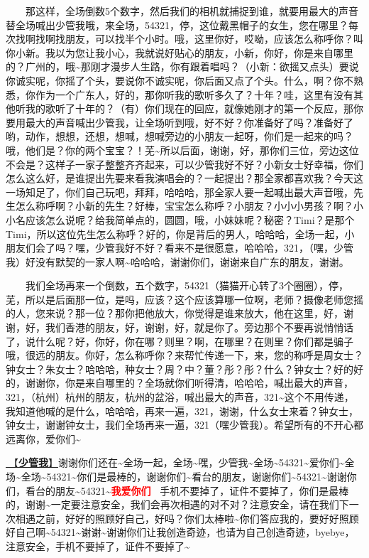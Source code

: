 \documentclass[]{ctexbook}
\begin{document}
  那这样，全场倒数5个数字，然后我们的相机就捕捉到谁，就要用最大的声音替全场喊出少管我哦，来全场，54321，停，这位戴黑帽子的女生，您在哪里？每次找啊找啊找朋友，可以找半个小时。哦，这里你好，哎呦，应该怎么称呼你？叫你小新。我以为您让我小心，我就说好贴心的朋友，小新，你好，你是来自哪里的？广州的，哦\textasciitilde 那刚才漫步人生路，你有跟着唱吗？（小新：欲摇又点头）要说你诚实呢，你摇了个头，要说你不诚实呢，你后面又点了个头。什么，啊？你不熟悉，你作为一个广东人，好的，那你听我的歌听多久了？十年？哇，这里有没有其他听我的歌听了十年的？（有）你们现在的回应，就像她刚才的第一个反应，那你要用最大的声音喊出少管我，让全场听到哦，好不好？你准备好了吗？准备好了哟，动作，想想，还想，想喊，想喊旁边的小朋友一起呀，你们是一起来的吗？哦，他们是？你的两个宝宝？！芜\textasciitilde 所以后面，谢谢，好，那你们三位，旁边这位不会是？这样子一家子整整齐齐起来，可以少管我好不好？小新女士好幸福，你们怎么这么好，是谁提出先要来看我演唱会的？一起提出？那全家都喜欢我？今天这一场知足了，你们自己玩吧，拜拜，哈哈哈，那全家人要一起喊出最大声音哦，先生怎么称呼啊？小新的先生？好棒，宝宝怎么称呼？小朋友？小小小男孩？啊？小小名应该怎么说呢？给我简单点的，圆圆，哦，小妹妹呢？秘密？Timi？是那个Timi，所以这位先生怎么称呼？好的，你是背后的男人，哈哈哈，全场一起，小朋友们会了吗？嘿，少管我好不好？看来不是很愿意，哈哈哈，321，（嘿，少管我）好没有默契的一家人啊\textasciitilde 哈哈哈，谢谢你们，谢谢来自广东的朋友，谢谢。

  我们全场再来一个倒数，五个数字，54321（猫猫开心转了3个圈圈），停，芜，所以是后面那一位，是吗，应该？这个应该算哪一位啊，老师？摄像老师您摇的人，您来说？那一位？那你把他放大，你觉得是谁来放大，他在这里，好，谢谢，好，我们香港的朋友，好，谢谢，好，就是你了。旁边那个不要再说悄悄话了，说什么呢？好，你好，你在哪？则里？啊，在哪里？在则里？你们都是骗子哦，很远的朋友。你好，怎么称呼你？来帮忙传递一下，来，您的称呼是周女士？钟女士？朱女士？哈哈哈，种女士？周？中？董？彤？彤？什么？钟女士？好的好的，谢谢你，你是来自哪里的？全场就你们听得清，哈哈哈，喊出最大的声音，321，（杭州）杭州的朋友，杭州的盆浴，喊出最大的声音，321\textasciitilde 这个不用传递，我知道他喊的是什么，哈哈哈，再来一遍，321，谢谢，什么女士来着？钟女士，钟女士，谢谢钟女士，我们全场再来一遍，321（嘿少管我）。希望所有的不开心都远离你，爱你们\textasciitilde{}

\hyperref[watch-ur-manners]{🎵【\textbf{少管我}】}谢谢你们还在\textasciitilde 全场一起，全场\textasciitilde 嘿，少管我\textasciitilde 全场\textasciitilde54321\textasciitilde 爱你们\textasciitilde 全场\textasciitilde 全场\textasciitilde54321\textasciitilde 你们是最棒的，谢谢你们\textasciitilde 看台的朋友，谢谢你们\textasciitilde54321\textasciitilde 谢谢你们，看台的朋友\textasciitilde54321\textasciitilde{}\textbf{\textcolor{red}{我爱你们~} } 手机不要掉了，证件不要掉了，你们是最棒的，谢谢\textasciitilde 一定要注意安全，我们会再次相遇的对不对？注意安全，请在我们下一次相遇之前，好好的照顾好自己，好吗？你们太棒啦\textasciitilde 你们答应我的，要好好照顾好自己啊\textasciitilde54321\textasciitilde 谢谢\textasciitilde 谢谢你们让我创造奇迹，也请为自己创造奇迹，byebye，注意安全，手机不要掉了，证件不要掉了\textasciitilde{}
\end{document}
